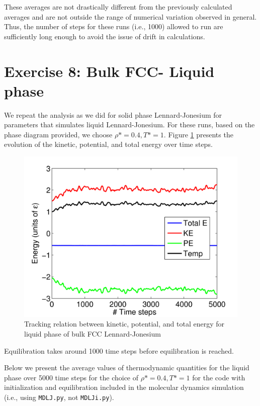 \documentclass[12pt, oneside]{article}
\begin{document}
These averages are not drastically different from the previously calculated averages and are not outside the range of numerical variation observed in general. Thus, the number of steps for these runs (i.e., 1000) allowed to run are sufficiently long enough to avoid the issue of drift in calculations.

\section{Exercise 8: Bulk FCC- Liquid phase}

We repeat the analysis as we did for solid phase Lennard-Jonesium for parameters that simulates liquid Lennard-Jonesium. For these runs, based on the phase diagram provided, we choose $\rho* = 0.4, T* = 1$. Figure \ref{fig:liq} presents the evolution of the kinetic, potential, and total energy over time steps.

\begin{figure}[htbp]
   \centering
   \includegraphics{./figs/ex8-etk.png} %
   \caption{Tracking relation between kinetic, potential, and total energy for liquid phase of bulk FCC Lennard-Jonesium}
   \label{fig:liq}
\end{figure}

Equilibration takes around 1000 time steps before equilibration is reached.

Below we present the average values of thermodynamic quantities for the liquid phase over 5000 time steps for the choice of $\rho* = 0.4, T* = 1$ for the code with initialization and equilibration included in the molecular dynamics simulation (i.e., using \verb!MDLJ.py!, not \verb!MDLJi.py!).
\end{document}
